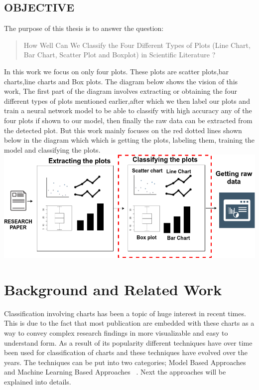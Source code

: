 \documentclass[12pt, a4paper,oneside]{report}
\begin{document}
\section{OBJECTIVE}
The purpose of this thesis is to answer the question: \begin{quote} How Well Can We Classify the Four Different Types of Plots (Line Chart, Bar Chart, Scatter Plot and Boxplot) in Scientific Literature ? \end{quote} In this work we focus on only four plots. These plots are scatter plots,bar charts,line charts and Box plots. The diagram below shows the vision of this work, The first part of the diagram involves extracting or obtaining  the four different types of plots mentioned earlier,after which we then label our plots and train a neural network model to be able to classify with high accuracy any of the four plots if shown to our model, then finally the raw data can be extracted from the detected plot.
But this work mainly focuses on the red dotted lines shown below in the diagram which which is getting the plots, labeling them, training the model and classifying the plots. \\
\includegraphics [scale=0.5] {vision}

\chapter{Background and Related Work}
Classification involving charts has been a topic of huge interest in recent times. This is due to the fact that most publication are embedded  with these charts as a way to convey complex research findings in more visualizable and easy to understand form. As a result of its popularity different techniques have over time been used for classification of charts and these techniques have evolved over the years. 
The techniques can be put into two categories; Model Based Approaches and Machine Learning Based Approaches ~\cite{amara2017convolutional}. Next the approaches will be explained into details.
\end{document}

